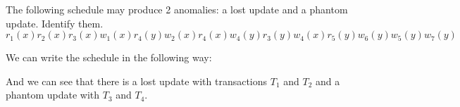 \documentclass[12pt, a4paper]{report}
\newtheorem[style=M,bodystyle=\normalfont]{theorem}{Theorem}
\newtheorem[style=M,bodystyle=\normalfont]{corollary}{Corollary}
\newtheorem[style=M,bodystyle=\normalfont]{lemma}{Lemma}
\newtheorem[style=M,bodystyle=\normalfont]{definition}{Definition}
\begin{document}
    \begin{Exercise}[label=2]
        The following schedule may produce 2 anomalies: a lost update and a phantom update. Identify them. 
        \[r_1(x) r_2(x) r_3(x) w_1(x) r_4(y) w_2(x) r_4(x) w_4(y) r_3(y)w_4(x) r_5(y) w_6(y) w_5(y) w_7(y)\]
    \end{Exercise}
    \begin{Answer}[ref=2]
        We can write the schedule in the following way: 
    \begin{table}[H]
        \centering
    \end{table}
        And we can see that there is a lost update with transactions $T_1$ and $T_2$ and a phantom update with $T_3$ and $T_4$. 
    \end{Answer}
\end{document}
